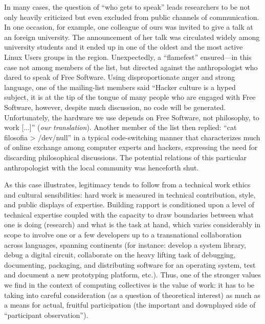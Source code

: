 \documentclass[10pt,letter,oneside]{scrartcl}
\begin{document}
In many cases, the question of ``who gets to speak'' leads researchers
to be not only heavily criticized but even excluded from public
channels of communication.  In one occasion, for example, one colleague
of ours was invited to give a talk at an foreign university. The  
announcement of her talk was circulated widely among university students
and it ended up in one of the oldest and the most active Linux Users groups 
in the region. Unexpectedly, a ``flamefest'' ensured---in this case not among 
members of the list, but directed against the anthropologist who dared 
to speak of Free Software. Using disproportionate anger and strong language, 
one of the mailing-list members said ``Hacker culture is a hyped subject, it 
is at the tip of the tongue of many people who are engaged with Free Software, 
however, despite much discussion, no code will be generated. Unfortunately, 
the hardware we use depends on Free Software, not philosophy, to work 
{[}...{]}'' (\emph{our translation}). Another member of the list then replied: 
``cat filosofia \textgreater{} /dev/null'' in a typical code-switching
manner that characterizes much of online exchange among computer experts 
and hackers, expressing the need for discarding philosophical discussions. 
The potential relations of this particular anthropologist with the local 
community was henceforth shut.


As this case illustrates, legitimacy tends to follow from a technical
work ethics and cultural sensibilities: hard work is measured in technical 
contribution, style, and public displays of expertise. Building rapport is 
conditioned upon a level of technical expertise coupled with the capacity 
to draw boundaries between what one is doing (research) and what is the 
task at hand, which varies considerably in scope to involve one or a few
developers up to a transnational collaboration across languages,
spanning continents (for instance: develop a system library, debug a
digital circuit, collaborate on the heavy lifting task of debugging,
documenting, packaging, and distributing software for an operating
system, test and document a new prototyping platform, etc.). Thus, 
one of the stronger values we find in the context of computing
collectives is the value of work: it has to be taking into careful
consideration (as a question of theoretical interest) as much as a
means for actual, fruitful participation (the important and downplayed
side of ``participant observation'').  
\end{document}
